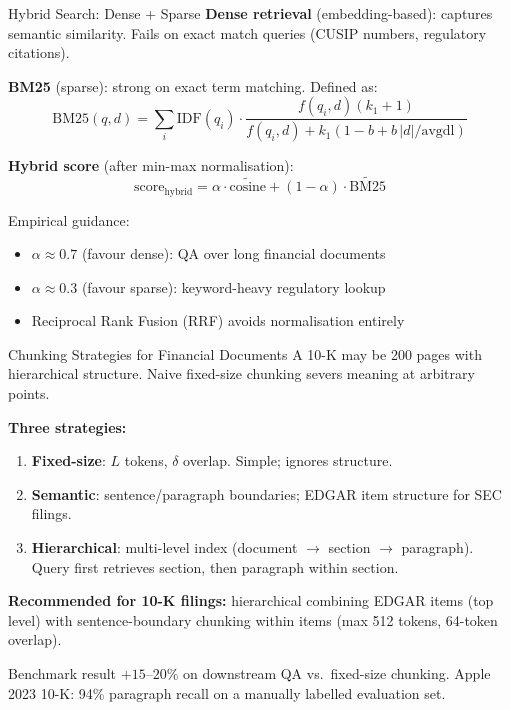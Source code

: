 \documentclass[9pt,t]{beamer}
\begin{document}
\begin{frame}[noframenumbering]{Hybrid Search: Dense + Sparse}
\textbf{Dense retrieval} (embedding-based): captures semantic similarity.
Fails on exact match queries (CUSIP numbers, regulatory citations).

\medskip
\textbf{BM25} (sparse): strong on exact term matching. Defined as:
\[
  \text{BM25}(q,d) = \sum_{i} \text{IDF}(q_i) \cdot
  \frac{f(q_i,d)(k_1+1)}{f(q_i,d) + k_1(1-b+b\,|d|/\text{avgdl})}
\]

\textbf{Hybrid score} (after min-max normalisation):
\[
  \text{score}_{\text{hybrid}} =
  \alpha \cdot \widetilde{\text{cosine}} + (1-\alpha) \cdot \widetilde{\text{BM25}}
\]

\medskip
Empirical guidance:
\begin{itemize}
  \item $\alpha \approx 0.7$ (favour dense): QA over long financial documents
  \item $\alpha \approx 0.3$ (favour sparse): keyword-heavy regulatory lookup
  \item Reciprocal Rank Fusion (RRF) avoids normalisation entirely
\end{itemize}
\end{frame}

\begin{frame}[noframenumbering]{Chunking Strategies for Financial Documents}
A 10-K may be 200 pages with hierarchical structure.
Naive fixed-size chunking severs meaning at arbitrary points.

\medskip
\textbf{Three strategies:}
\begin{enumerate}
  \item \textbf{Fixed-size}: $L$ tokens, $\delta$ overlap. Simple; ignores structure.
  \item \textbf{Semantic}: sentence/paragraph boundaries; EDGAR item structure for SEC filings.
  \item \textbf{Hierarchical}: multi-level index (document $\to$ section $\to$ paragraph).
        Query first retrieves section, then paragraph within section.
\end{enumerate}

\medskip
\textbf{Recommended for 10-K filings:} hierarchical combining EDGAR items (top level)
with sentence-boundary chunking within items (max 512 tokens, 64-token overlap).

\begin{block}{Benchmark result}
$+15$--$20\%$ on downstream QA vs.\ fixed-size chunking.
Apple 2023 10-K: 94\% paragraph recall on a manually labelled evaluation set.
\end{block}
\end{frame}
\end{document}
